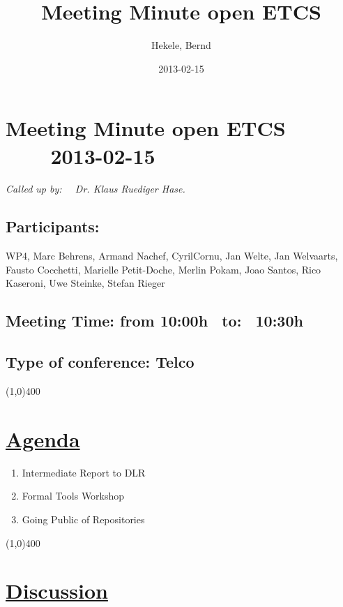 \documentclass[a4paper]{article}
\title{Meeting Minute open ETCS}
\author{Hekele, Bernd}
\date{2013-02-15}
\begin{document}
\section*{\large{Meeting Minute open ETCS \ \ \ \ 2013-02-15}}

\large{\emph{Called up by: \ \  Dr. Klaus Ruediger Hase.}}

\subsection*{Participants:} WP4, Marc Behrens, Armand Nachef, CyrilCornu, Jan Welte, Jan Welvaarts,  Fausto Cocchetti, Marielle Petit-Doche, Merlin Pokam, Joao Santos, Rico Kaseroni, Uwe Steinke, Stefan Rieger\\

\subsection*{Meeting Time: from 10:00h \ to: \ 10:30h}

\subsection*{Type of conference: Telco}

\line(1,0){400}
\section*{\underline{Agenda}}
\begin{enumerate}
\item Intermediate Report to DLR
\item Formal Tools Workshop
\item Going Public of Repositories
\end{enumerate}
\line(1,0){400}
\section*{\underline{Discussion}}
\end{document}

